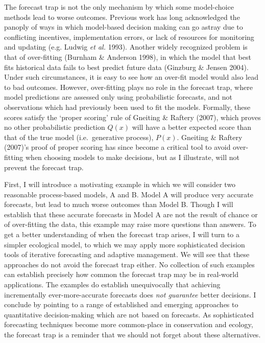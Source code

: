 \documentclass[3p]{elsarticle} %
\begin{document}
The forecast trap is not the only mechanism by which some model-choice
methods lead to worse outcomes. Previous work has long acknowledged the
panoply of ways in which model-based decision making can go astray due
to conflicting incentives, implementation errors, or lack of resources
for monitoring and updating (e.g. Ludwig \emph{et al.} 1993). Another
widely recognized problem is that of over-fitting (Burnham \& Anderson
1998), in which the model that best fits historical data fails to best
predict future data (Ginzburg \& Jensen 2004). Under such circumstances,
it is easy to see how an over-fit model would also lead to bad outcomes.
However, over-fitting plays no role in the forecast trap, where model
predictions are assessed only using probabilistic forecasts, and not
observations which had previously been used to fit the models. Formally,
these scores satisfy the `proper scoring' rule of Gneiting \& Raftery
(2007), which proves no other probabilistic prediction \(Q(x)\) will
have a better expected score than that of the true model
(i.e.~generative process), \(P(x)\). Gneiting \& Raftery (2007)'s proof
of proper scoring has since become a critical tool to avoid over-fitting
when choosing models to make decisions, but as I illustrate, will not
prevent the forecast trap.

First, I will introduce a motivating example in which we will consider
two reasonable process-based models, A and B. Model A will produce very
accurate forecasts, but lead to much worse outcomes than Model B. Though
I will establish that these accurate forecasts in Model A are not the
result of chance or of over-fitting the data, this example may raise
more questions than answers. To get a better understanding of when the
forecast trap arises, I will turn to a simpler ecological model, to
which we may apply more sophisticated decision tools of iterative
forecasting and adaptive management. We will see that these approaches
do not avoid the forecast trap either. No collection of such examples
can establish precisely how common the forecast trap may be in
real-world applications. The examples do establish unequivocally that
achieving incrementally ever-more-accurate forecasts does \emph{not
guarantee} better decisions. I conclude by pointing to a range of
established and emerging approaches to quantitative decision-making
which are not based on forecasts. As sophisticated forecasting
techniques become more common-place in conservation and ecology, the
forecast trap is a reminder that we should not forget about these
alternatives.
\end{document}
